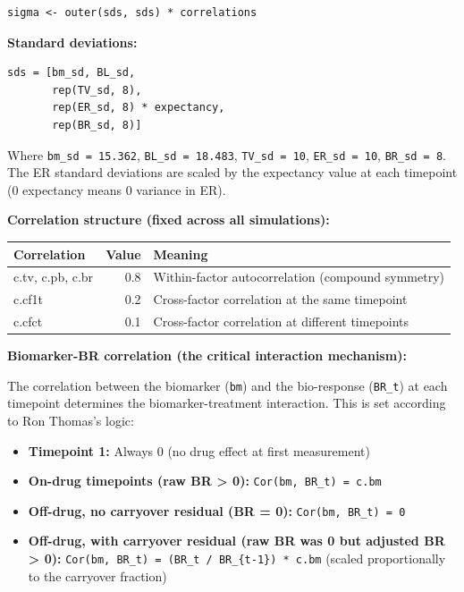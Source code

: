 \documentclass[11pt]{article}
\begin{document}
\begin{lstlisting}
sigma <- outer(sds, sds) * correlations
\end{lstlisting}

\textbf{Standard deviations:}

\begin{verbatim}
sds = [bm_sd, BL_sd,
       rep(TV_sd, 8),
       rep(ER_sd, 8) * expectancy,
       rep(BR_sd, 8)]
\end{verbatim}

Where \texttt{bm\_sd = 15.362}, \texttt{BL\_sd = 18.483}, \texttt{TV\_sd = 10},
\texttt{ER\_sd = 10}, \texttt{BR\_sd = 8}. The ER standard deviations are
scaled by the expectancy value at each timepoint (0 expectancy
means 0 variance in ER).

\textbf{Correlation structure (fixed across all simulations):}

\begin{table}[h]
\centering
\begin{tabular}{lrl}
\toprule
Correlation & Value & Meaning \\
\midrule
c.tv, c.pb, c.br & 0.8 & Within-factor autocorrelation (compound symmetry) \\
c.cf1t & 0.2 & Cross-factor correlation at the same timepoint \\
c.cfct & 0.1 & Cross-factor correlation at different timepoints \\
\bottomrule
\end{tabular}
\end{table}

\textbf{Biomarker-BR correlation (the critical interaction mechanism):}

The correlation between the biomarker (\texttt{bm}) and the bio-response
(\texttt{BR\_t}) at each timepoint determines the biomarker-treatment
interaction. This is set according to Ron Thomas's logic:

\begin{itemize}
  \item \textbf{Timepoint 1:} Always 0 (no drug effect at first measurement)
  \item \textbf{On-drug timepoints (raw BR > 0):} \texttt{Cor(bm, BR\_t) = c.bm}
  \item \textbf{Off-drug, no carryover residual (BR = 0):} \texttt{Cor(bm, BR\_t) = 0}
  \item \textbf{Off-drug, with carryover residual (raw BR was 0 but adjusted
    BR > 0):} \texttt{Cor(bm, BR\_t) = (BR\_t / BR\_\{t-1\}) * c.bm}
    (scaled proportionally to the carryover fraction)
\end{itemize}
\end{document}
